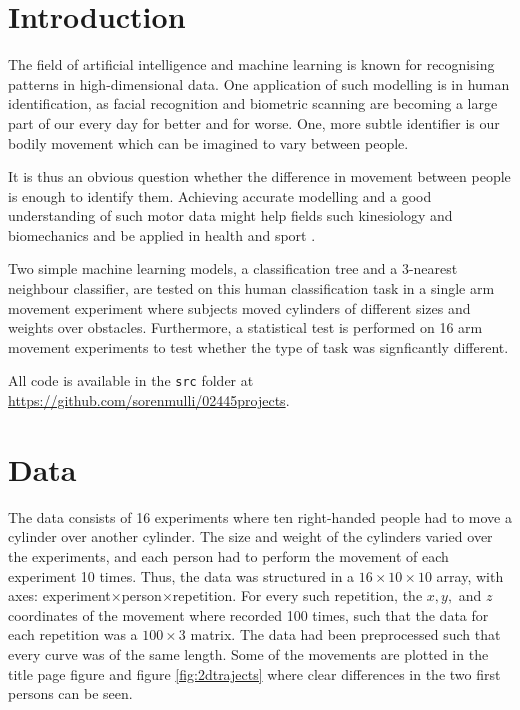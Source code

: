 \documentclass[11pt,fleqn]{article}
\begin{document}
\section{Introduction}
The field of artificial intelligence and machine learning is known for recognising patterns in high-dimensional data. 
One application of such modelling is in human identification, as facial recognition and biometric scanning are becoming a large part of our every day for better and for worse. One, more subtle identifier is our bodily movement which can be imagined to vary between people.

It is thus an obvious question whether the difference in movement between people is enough to identify them. Achieving accurate modelling and a good understanding of such motor data might help fields such kinesiology and biomechanics and be applied in health and sport \cite{kine}.

Two simple machine learning models, a classification tree and a 3-nearest neighbour classifier, are tested on this human classification task in a single arm movement experiment where subjects moved cylinders of different sizes and weights over obstacles. Furthermore, a statistical test is performed on 16 arm movement experiments to test whether the type of task was signficantly different.

All code is available in the \texttt{src} folder at \url{https://github.com/sorenmulli/02445projects}.

\section{Data}
The data consists of 16 experiments where ten right-handed people had to move a cylinder over another cylinder.
The size and weight of the cylinders varied over the experiments, and each person had to perform the movement of each experiment 10 times.
Thus, the data was structured in a $ 16\times 10\times 10 $ array, with axes: experiment\(\times\)person\(\times\)repetition.
For every such repetition, the $ x, y, $ and $ z $ coordinates of the movement where recorded 100 times, such that the data for each repetition was a $ 100\times 3 $ matrix.
The data had been preprocessed such that every curve was of the same length.
Some of the movements are plotted in the title page figure  and figure \ref{fig:2dtrajects} where clear differences in the two first persons can be seen.
\end{document}
